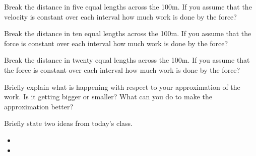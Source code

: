 \begin{problem}
  \begin{subproblem}
  \item Break the distance in five equal lengths across the 100m.  If
    you assume that the velocity is constant over each interval how much
    work is done by the force?

    \vfill

  \item Break the distance in ten equal lengths across the 100m.  If
    you assume that the force is constant over each interval how much
    work is done by the force?

    \vfill

    \clearpage

  \item Break the distance in twenty equal lengths across the 100m.  If
    you assume that the force is constant over each interval how much
    work is done by the force?

    \vfill

  \item Briefly explain what is happening with respect to your
    approximation of the work. Is it getting bigger or smaller? What
    can you do to make the approximation better?

    \vspace{3em}

  \end{subproblem}
\end{problem}

\postClass

\begin{problem}
\item Briefly state two ideas from today's class.
  \begin{itemize}
  \item 
  \item 
  \end{itemize}
\item 
  \begin{subproblem}
    \item
  \end{subproblem}
\end{problem}




